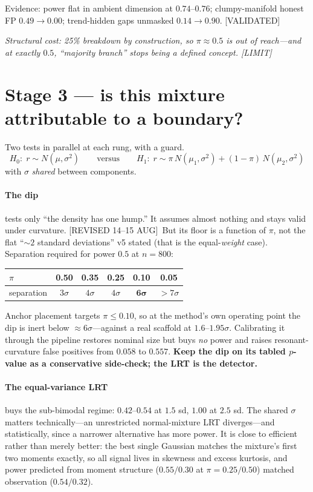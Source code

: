 \documentclass[11pt]{article}
\newcommand{\provtag}[2]{{\footnotesize\sffamily\textcolor{#1}{[#2]}}}
\newcommand{\VALID}{\provtag{okgreen}{VALIDATED}}
\newcommand{\LIMIT}{\provtag{limred}{LIMIT}}
\newcommand{\REVI}{\provtag{openamber}{REVISED 14--15 AUG}}
\newcommand{\why}[1]{\par\smallskip\noindent\textcolor{muted}{\small\itshape #1}\par\smallskip}
\begin{document}
Evidence: power flat in ambient dimension at $0.74$--$0.76$; clumpy-manifold honest FP
$0.49 \to 0.00$; trend-hidden gaps unmasked $0.14 \to 0.90$. \VALID

\why{Structural cost: 25\% breakdown by construction, so $\pi \approx 0.5$ is out of reach---and
at exactly $0.5$, ``majority branch'' stops being a defined concept. \LIMIT}

\section{Stage 3 --- is this mixture attributable to a boundary?}
\label{sec:stage3}

Two tests in parallel at each rung, with a guard.
\[
  H_0:\; r \sim N(\mu,\sigma^2)
  \qquad\text{versus}\qquad
  H_1:\; r \sim \pi\,N(\mu_1,\sigma^2) + (1-\pi)\,N(\mu_2,\sigma^2)
\]
with $\sigma$ \emph{shared} between components.

\paragraph{The dip} tests only ``the density has one hump.'' It assumes almost nothing and stays
valid under curvature. \REVI\ But its floor is a function of $\pi$, not the flat ``${\sim}2$
standard deviations'' v5 stated (that is the equal-\emph{weight} case). Separation required for
power $0.5$ at $n = 800$:

\begin{center}\small
\begin{tabular}{@{}lccccc@{}}
\toprule
$\pi$ & 0.50 & 0.35 & 0.25 & 0.10 & 0.05\\
\midrule
separation & $3\sigma$ & $4\sigma$ & $4\sigma$ & $\mathbf{6\sigma}$ & $>7\sigma$\\
\bottomrule
\end{tabular}
\end{center}

\noindent Anchor placement targets $\pi \le 0.10$, so at the method's own operating point the
dip is inert below ${\approx}6\sigma$---against a real scaffold at $1.6$--$1.95\sigma$.
Calibrating it through the pipeline restores nominal size but buys \emph{no} power and raises
resonant-curvature false positives from $0.058$ to $0.557$. \textbf{Keep the dip on its tabled
$p$-value as a conservative side-check; the LRT is the detector.}

\paragraph{The equal-variance LRT} buys the sub-bimodal regime: $0.42$--$0.54$ at $1.5$ sd,
$1.00$ at $2.5$ sd. The shared $\sigma$ matters technically---an unrestricted normal-mixture LRT
diverges---and statistically, since a narrower alternative has more power. It is close to
efficient rather than merely better: the best single Gaussian matches the mixture's first two
moments exactly, so all signal lives in skewness and excess kurtosis, and power predicted from
moment structure ($0.55 / 0.30$ at $\pi = 0.25 / 0.50$) matched observation ($0.54 / 0.32$).
\end{document}
